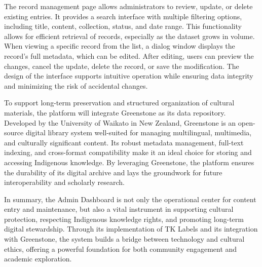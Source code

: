 The record management page allows administrators to review, update, or delete existing entries. It provides a search interface with multiple filtering options, including title, content, collection, status, and date range. This functionality allows for efficient retrieval of records, especially as the dataset grows in volume. When viewing a specific record from the list, a dialog window displays the record’s full metadata, which can be edited. After editing, users can preview the changes, cancel the update, delete the record, or save the modification. The design of the interface supports intuitive operation while ensuring data integrity and minimizing the risk of accidental changes.

To support long-term preservation and structured organization of cultural materials, the platform will integrate Greenstone as its data repository. Developed by the University of Waikato in New Zealand, Greenstone is an open-source digital library system well-suited for managing multilingual, multimedia, and culturally significant content. Its robust metadata management, full-text indexing, and cross-format compatibility make it an ideal choice for storing and accessing Indigenous knowledge. By leveraging Greenstone, the platform ensures the durability of its digital archive and lays the groundwork for future interoperability and scholarly research.

In summary, the Admin Dashboard is not only the operational center for content entry and maintenance, but also a vital instrument in supporting cultural protection, respecting Indigenous knowledge rights, and promoting long-term digital stewardship. Through its implementation of TK Labels and its integration with Greenstone, the system builds a bridge between technology and cultural ethics, offering a powerful foundation for both community engagement and academic exploration.
